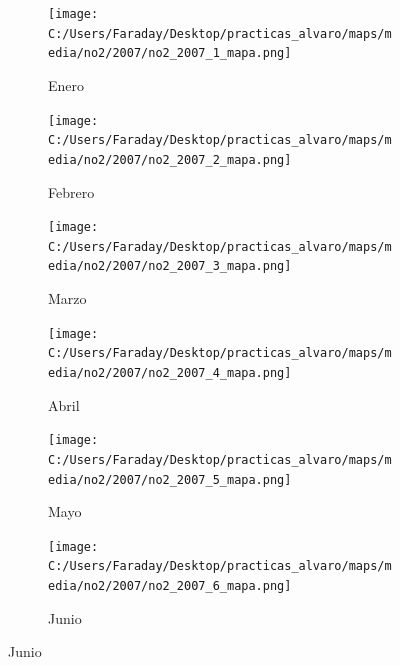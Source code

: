 \documentclass[12pt]{article}
\begin{document}
\begin{figure}[H]
\centering
\begin{subfigure}[H]{0.15\textwidth}
\texttt{[image: C:/Users/Faraday/Desktop/practicas\_alvaro/maps/media/no2/2007/no2\_2007\_1\_mapa.png]}
\captionsetup{labelformat=empty}
\caption{Enero}
\label{fig:map-no2-2007-1}
\end{subfigure}
%
\begin{subfigure}[H]{0.15\textwidth}
\texttt{[image: C:/Users/Faraday/Desktop/practicas\_alvaro/maps/media/no2/2007/no2\_2007\_2\_mapa.png]}
\captionsetup{labelformat=empty}
\caption{Febrero}
\label{fig:map-no2-2007-2}
\end{subfigure}
%
\begin{subfigure}[H]{0.15\textwidth}
\texttt{[image: C:/Users/Faraday/Desktop/practicas\_alvaro/maps/media/no2/2007/no2\_2007\_3\_mapa.png]}
\captionsetup{labelformat=empty}
\caption{Marzo}
\label{fig:map-no2-2007-3}
\end{subfigure}
%
\begin{subfigure}[H]{0.15\textwidth}
\texttt{[image: C:/Users/Faraday/Desktop/practicas\_alvaro/maps/media/no2/2007/no2\_2007\_4\_mapa.png]}
\captionsetup{labelformat=empty}
\caption{Abril}
\label{fig:map-no2-2007-4}
\end{subfigure}
%
\begin{subfigure}[H]{0.15\textwidth}
\texttt{[image: C:/Users/Faraday/Desktop/practicas\_alvaro/maps/media/no2/2007/no2\_2007\_5\_mapa.png]}
\captionsetup{labelformat=empty}
\caption{Mayo}
\label{fig:map-no2-2007-5}
\end{subfigure}
%
\begin{subfigure}[H]{0.15\textwidth}
\texttt{[image: C:/Users/Faraday/Desktop/practicas\_alvaro/maps/media/no2/2007/no2\_2007\_6\_mapa.png]}
\captionsetup{labelformat=empty}
\caption{Junio}
\label{fig:map-no2-2007-6}
\end{subfigure}


\end{figure}
\end{document}
